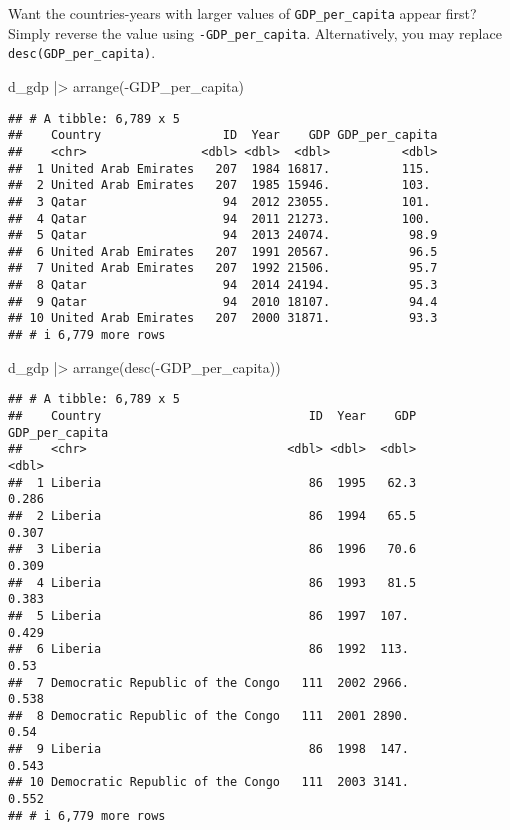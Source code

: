 \documentclass[
]{article}
\newenvironment{Shaded}{\begin{snugshade}}{\end{snugshade}}
\newcommand{\FunctionTok}[1]{\textcolor[rgb]{0.00,0.00,0.00}{#1}}
\newcommand{\NormalTok}[1]{#1}
\newcommand{\SpecialCharTok}[1]{\textcolor[rgb]{0.00,0.00,0.00}{#1}}
\begin{document}
Want the countries-years with larger values of \texttt{GDP\_per\_capita}
appear first? Simply reverse the value using \texttt{-GDP\_per\_capita}.
Alternatively, you may replace \texttt{desc(GDP\_per\_capita)}.

\begin{Shaded}
\begin{Highlighting}[]
\NormalTok{d\_gdp }\SpecialCharTok{|\textgreater{}} \FunctionTok{arrange}\NormalTok{(}\SpecialCharTok{{-}}\NormalTok{GDP\_per\_capita)}
\end{Highlighting}
\end{Shaded}

\begin{verbatim}
## # A tibble: 6,789 x 5
##    Country                 ID  Year    GDP GDP_per_capita
##    <chr>                <dbl> <dbl>  <dbl>          <dbl>
##  1 United Arab Emirates   207  1984 16817.          115. 
##  2 United Arab Emirates   207  1985 15946.          103. 
##  3 Qatar                   94  2012 23055.          101. 
##  4 Qatar                   94  2011 21273.          100. 
##  5 Qatar                   94  2013 24074.           98.9
##  6 United Arab Emirates   207  1991 20567.           96.5
##  7 United Arab Emirates   207  1992 21506.           95.7
##  8 Qatar                   94  2014 24194.           95.3
##  9 Qatar                   94  2010 18107.           94.4
## 10 United Arab Emirates   207  2000 31871.           93.3
## # i 6,779 more rows
\end{verbatim}

\begin{Shaded}
\begin{Highlighting}[]
\NormalTok{d\_gdp }\SpecialCharTok{|\textgreater{}} \FunctionTok{arrange}\NormalTok{(}\FunctionTok{desc}\NormalTok{(}\SpecialCharTok{{-}}\NormalTok{GDP\_per\_capita))}
\end{Highlighting}
\end{Shaded}

\begin{verbatim}
## # A tibble: 6,789 x 5
##    Country                             ID  Year    GDP GDP_per_capita
##    <chr>                            <dbl> <dbl>  <dbl>          <dbl>
##  1 Liberia                             86  1995   62.3          0.286
##  2 Liberia                             86  1994   65.5          0.307
##  3 Liberia                             86  1996   70.6          0.309
##  4 Liberia                             86  1993   81.5          0.383
##  5 Liberia                             86  1997  107.           0.429
##  6 Liberia                             86  1992  113.           0.53 
##  7 Democratic Republic of the Congo   111  2002 2966.           0.538
##  8 Democratic Republic of the Congo   111  2001 2890.           0.54 
##  9 Liberia                             86  1998  147.           0.543
## 10 Democratic Republic of the Congo   111  2003 3141.           0.552
## # i 6,779 more rows
\end{verbatim}
\end{document}
